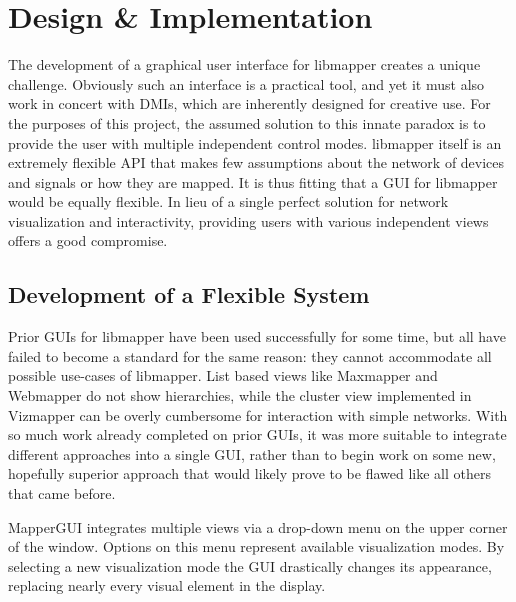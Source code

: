 \chapter{Design \& Implementation}

	The development of a graphical user interface for libmapper creates a unique challenge. Obviously such an interface is a practical tool, and yet it must also work in concert with DMIs, which are inherently designed for creative use. For the purposes of this project, the assumed solution to this innate paradox is to provide the user with multiple independent control modes. libmapper itself is an extremely flexible API that makes few assumptions about the network of devices and signals or how they are mapped. It is thus fitting that a GUI for libmapper would be equally flexible. In lieu of a single perfect solution for network visualization and interactivity, providing users with various independent views offers a good compromise.

\section{Development of a Flexible System} %
\label{sec:development_of_a_flexible_system}

Prior GUIs for libmapper have been used successfully for some time, but all have failed to become a standard for the same reason: they cannot accommodate all possible use-cases of libmapper. List based views like Maxmapper and Webmapper do not show hierarchies, while the cluster view implemented in Vizmapper can be overly cumbersome for interaction with simple networks. With so much work already completed on prior GUIs, it was more suitable to integrate different approaches into a single GUI, rather than to begin work on some new, hopefully superior approach that would likely prove to be flawed like all others that came before. 

MapperGUI integrates multiple views via a drop-down menu on the upper corner of the window. Options on this menu represent available visualization modes. By selecting a new visualization mode the GUI drastically changes its appearance, replacing nearly every visual element in the display.

